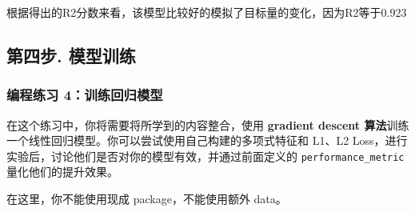 \documentclass[11pt]{article}
\begin{document}
根据得出的R2分数来看，该模型比较好的模拟了目标量的变化，因为R2等于0.923

    \subsection{第四步.
模型训练}\label{ux7b2cux56dbux6b65.-ux6a21ux578bux8badux7ec3}

\subsubsection{编程练习
4：训练回归模型}\label{ux7f16ux7a0bux7ec3ux4e60-4ux8badux7ec3ux56deux5f52ux6a21ux578b}

在这个练习中，你将需要将所学到的内容整合，使用 \textbf{gradient descent
算法}训练一个线性回归模型。你可以尝试使用自己构建的多项式特征和 L1、L2
Loss，进行实验后，讨论他们是否对你的模型有效，并通过前面定义的
\texttt{performance\_metric} 量化他们的提升效果。

在这里，你不能使用现成 package，不能使用额外 data。
\end{document}
